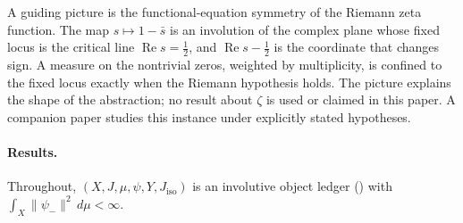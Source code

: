 \documentclass[11pt]{article}
\newcommand{\psim}{\psi_{-}}
\newcommand{\Jiso}{J_{\mathrm{iso}}}
\theoremstyle{definition}
\begin{document}
A guiding picture is the functional-equation symmetry of the Riemann
zeta function.  The map \(s\mapsto1-\bar s\) is an involution of the
complex plane whose fixed locus is the critical line
\(\operatorname{Re}s=\tfrac12\), and \(\operatorname{Re}s-\tfrac12\)
is the coordinate that changes sign.  A measure on the nontrivial
zeros, weighted by multiplicity, is confined to the fixed locus
exactly when the Riemann hypothesis holds.  The picture explains the
shape of the abstraction; no result about \(\zeta\) is used or
claimed in this paper.  A companion paper \citep{TsiokosRHviaSDTC2026}
studies this instance under explicitly stated hypotheses.

\paragraph{Results.}
Throughout, \((X,J,\mu,\psi,Y,\Jiso)\) is an involutive object ledger
() with
\(\int_X\|\psim\|^2\,d\mu<\infty\).
\end{document}
